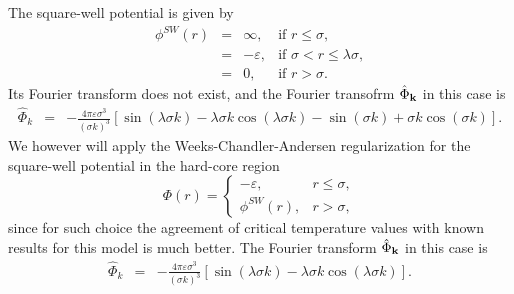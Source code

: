 The square-well potential is given by
\begin{equation}
	\label{def:sw}
	\begin{array}{llll}
		\phi^{SW}(r) & = & \infty, & \text{if } r\leq \sigma,
		\\
		& = & -\varepsilon, & \text{if } \sigma < r \leq \lambda\sigma,
		\\
		& = & 0, & \text{if } r > \sigma.
	\end{array}
\end{equation}
Its Fourier transform does not exist, and the Fourier transofrm $\hat{\Phi}_{\vb k}$ in this case is
\begin{eqnarray*}
	\hat{\Phi}_k & = & -\frac{4\pi\varepsilon\sigma^3}{(\sigma k)^3} 
	\left[\sin(\lambda \sigma k) - \lambda \sigma k \cos(\lambda \sigma k) - \sin(\sigma k) + \sigma k \cos(\sigma k)\right].
\end{eqnarray*}
We however will apply the Weeks-Chandler-Andersen regularization for the square-well potential
in the hard-core region
\begin{equation}
	\label{def:sw-wca}
	\Phi(r) = \left\{
	\begin{array}{cc}
		-\varepsilon, & r \leq \sigma, 
		\\
		\phi^{SW}(r), & r > \sigma,
	\end{array}
	\right.
\end{equation}
since for such choice the agreement of critical temperature values with known results for this model is much better. The Fourier transform $\hat{\Phi}_{\vb k}$ in this case is
\begin{eqnarray*}
	\hat{\Phi}_k & = & -\frac{4\pi\varepsilon\sigma^3}{(\sigma k)^3} 
	\left[\sin(\lambda \sigma k) - \lambda \sigma k \cos(\lambda \sigma k)\right].
\end{eqnarray*}

